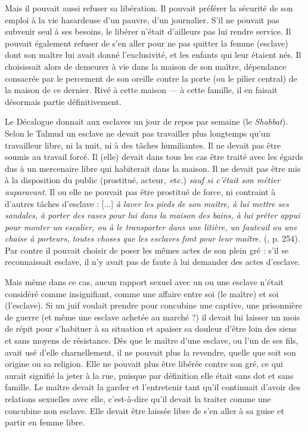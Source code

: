 Mais il pouvait aussi refuser sa libération. Il pouvait préférer la sécurité de son emploi à la vie hasardeuse d'un pauvre, d'un journalier. S'il ne pouvait pas subvenir seul à ses besoins, le libérer n'était d'ailleurs pas lui rendre service. Il pouvait également refuser de s'en aller pour ne pas quitter la femme (esclave) dont son maître lui avait donné l'exclusivité, et les enfants qui leur étaient nés. Il choisissait alors de demeurer à vie dans la maison de son maître, dépendance consacrée par le percement de son oreille contre la porte (ou le pilier central) de la maison de ce dernier. Rivé à cette maison --- à cette famille, il en faisait désormais partie définitivement.

 Le Décalogue donnait aux esclaves un jour de repos par semaine (le \emph{Shabbat}). Selon le Talmud un esclave ne devait pas travailler plus longtemps qu'un travailleur libre, ni la nuit, ni à des tâches humiliantes. Il ne devait pas être soumis au travail forcé. Il (elle) devait dans tous les cas être traité avec les égards dus à un mercenaire libre qui habiterait dans la maison. Il ne devait pas être mis à la disposition du public (prostitué, acteur,~etc.) \emph{sauf si c'était son métier auparavant}. Il ou elle ne pouvait pas être prostitué de force, ni contraint à d'autres tâches d'esclave : {[...] \emph{à laver les pieds de son maître, à lui mettre ses sandales, à porter des vases pour lui dans la maison des bains, à lui prêter appui pour monter un escalier, ou à le transporter dans une litière, un fauteuil ou une chaise à porteurs, toutes choses que les esclaves font pour leur maître.}} (, p. 254). Par contre il pouvait choisir de poser les mêmes actes de son plein gré : s'il se reconnaissait esclave, il n'y avait pas de faute à lui demander des actes d'esclave.

 Mais même dans ce cas, aucun rapport sexuel avec un ou une esclave n'était considéré comme insignifiant, comme une affaire entre soi (le maître) et soi (l'esclave). Si un juif voulait prendre pour concubine une captive, une prisonnière de guerre (et même une esclave achetée au marché ?) il devait lui laisser un mois de répit pour s'habituer à sa situation et apaiser sa douleur d'être loin des siens et sans moyens de résistance. Dès que le maître d'une esclave, ou l'un de ses fils, avait usé d'elle charnellement, il ne pouvait plus la revendre, quelle que soit son origine ou sa religion. Elle ne pouvait plus être libérée contre son gré, ce qui aurait signifié la jeter à la rue, puisque par définition elle était sans dot et sans famille. Le maître devait la garder et l'entretenir tant qu'il continuait d'avoir des relations sexuelles avec elle, c'est-à-dire qu'il devait la traiter comme une concubine non esclave. Elle devait être laissée libre de s'en aller à sa guise et partir en femme libre.

